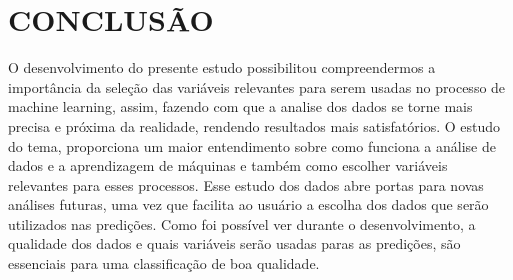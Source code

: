 \section{CONCLUSÃO}
O desenvolvimento do presente estudo possibilitou compreendermos a importância da seleção das variáveis relevantes para serem usadas no processo de machine learning, assim, fazendo com que a analise dos dados se torne mais precisa e próxima da realidade, rendendo resultados mais satisfatórios. O estudo do tema, proporciona um maior entendimento sobre como funciona a análise de dados e a aprendizagem de máquinas e também como escolher variáveis relevantes para esses processos. Esse estudo dos dados abre portas para novas análises futuras, uma vez que facilita ao usuário a escolha dos dados que serão utilizados nas predições. Como foi possível ver durante o desenvolvimento, a qualidade dos dados e quais variáveis serão usadas paras as predições, são essenciais para uma classificação de boa qualidade.